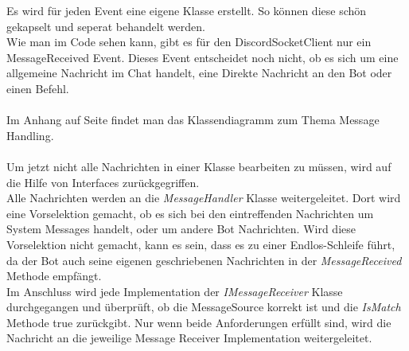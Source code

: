 \documentclass[a4paper, table]{article}
\begin{document}
Es wird für jeden Event eine eigene Klasse erstellt.
So können diese schön gekapselt und seperat behandelt werden.\\
Wie man im Code sehen kann, gibt es für den DiscordSocketClient nur ein MessageReceived Event.
Dieses Event entscheidet noch nicht, ob es sich um eine allgemeine Nachricht im Chat handelt, 
eine Direkte Nachricht an den Bot oder einen Befehl.\\\\
Im Anhang auf Seite \pageref*{fig:message-handling} findet man das Klassendiagramm zum Thema Message Handling.\\\\
Um jetzt nicht alle Nachrichten in einer Klasse bearbeiten zu müssen, wird auf die Hilfe von Interfaces zurückgegriffen.\\
Alle Nachrichten werden an die \textit{MessageHandler} Klasse weitergeleitet.
Dort wird eine Vorselektion gemacht, ob es sich bei den eintreffenden Nachrichten um System Messages handelt, oder um andere Bot Nachrichten.
Wird diese Vorselektion nicht gemacht, kann es sein, dass es zu einer Endlos-Schleife führt, 
da der Bot auch seine eigenen geschriebenen Nachrichten in der \textit{MessageReceived} Methode empfängt.\\
Im Anschluss wird jede Implementation der \textit{IMessageReceiver} Klasse durchgegangen und überprüft,
ob die MessageSource korrekt ist und die \textit{IsMatch} Methode true zurückgibt.
Nur wenn beide Anforderungen erfüllt sind, wird die Nachricht an die jeweilige Message Receiver Implementation weitergeleitet.
\end{document}
